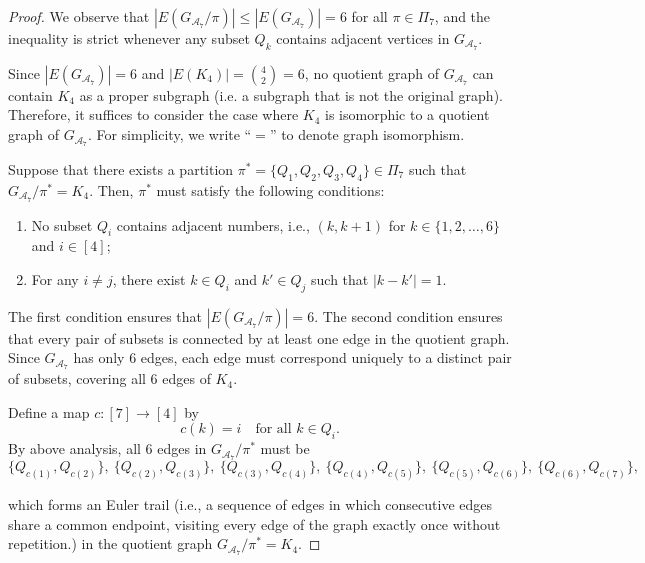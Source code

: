 \documentclass[12pt]{article}
\theoremstyle{plain}
\theoremstyle{definition}
\newcommand{\partition}{\Pi}
\newcommand{\partitionp}[1]{\partition_{#1}}
\newcommand{\edges}[0]{E}
\newcommand{\edgesp}[1]{E(#1)}
\newcommand{\completegraphp}[1]{K_{#1}}
\newcommand{\graphform}[1]{G_{#1}}
\def\calA{\mathcal{A}}
\begin{document}
\begin{bibunit}[agsm]
\begin{proof}
We observe that $|\edgesp{\graphform{\calA_7} / \pi}| \le |\edgesp{\graphform{\calA_7}}| = 6$ for all $\pi \in \partitionp{7}$, and the inequality is strict whenever any subset $Q_k$ contains adjacent vertices in $\graphform{\calA_7}$.

Since $|\edges(\graphform{\calA_7})| = 6$ and $|\edges(\completegraphp{4})| = \binom{4}{2} = 6$, no quotient graph of $\graphform{\calA_7}$ can contain $\completegraphp{4}$ as a proper subgraph (i.e. a subgraph that is not the original graph). 
Therefore, it suffices to consider the case where $\completegraphp{4}$ is isomorphic to a quotient graph of $\graphform{\calA_7}$. 
For simplicity, we write ``$=$'' to denote graph isomorphism.

Suppose that there exists a partition $\pi^{*} = \{ Q_1, Q_2, Q_3, Q_4 \} \in \Pi_7$ such that $\graphform{\calA_7} / \pi^{*} = \completegraphp{4}$. 
Then, $\pi^{*}$ must satisfy the following conditions:

\begin{enumerate}
    \item No subset $Q_i$ contains adjacent numbers, i.e., $(k, k+1)$ for $k \in \{1,2,\dots,6\}$ and $i \in [4]$;
    \item For any $i \neq j$, there exist $k \in Q_i$ and $k' \in Q_j$ such that $|k - k'| = 1$.
\end{enumerate}

The first condition ensures that $|\edgesp{\graphform{\calA_7} / \pi}| = 6$. 
The second condition ensures that every pair of subsets is connected by at least one edge in the quotient graph. 
Since $\graphform{\calA_7}$ has only $6$ edges, each edge must correspond uniquely to a distinct pair of subsets, covering all $6$ edges of $\completegraphp{4}$.

Define a map $c: [7] \to [4]$ by
\begin{equation*}
    c(k) = i \quad \text{for all } k \in Q_i.
\end{equation*}
By above analysis, all 6 edges in $\graphform{\calA_7} / \pi^*$ must be 
\begin{equation*}
\{ Q_{c(1)}, Q_{c(2)} \}, \ 
\{ Q_{c(2)}, Q_{c(3)} \}, \ 
\{ Q_{c(3)}, Q_{c(4)} \}, \ 
\{ Q_{c(4)}, Q_{c(5)} \}, \ 
\{ Q_{c(5)}, Q_{c(6)} \}, \ 
\{ Q_{c(6)}, Q_{c(7)} \},
\end{equation*}

which forms an Euler trail (i.e., a sequence of edges in which consecutive edges share a common endpoint, visiting every edge of the graph exactly once without repetition.) in the quotient graph $\graphform{\calA_7} / \pi^* = \completegraphp{4}$.


\end{proof}
\end{bibunit}
\end{document}
